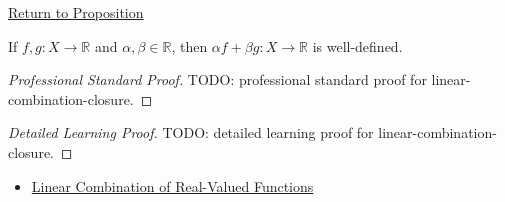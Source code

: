 \newpage
{}
\label{prf:linear-combination-closure}

\begin{remark*}[Return]
\hyperref[prop:linear-combination-closure]{Return to Proposition}
\end{remark*}

\begin{proposition*}
If \(f,g:X\to\mathbb{R}\) and \(\alpha,\beta\in\mathbb{R}\), then
\(\alpha f+\beta g:X\to\mathbb{R}\) is well-defined.
\end{proposition*}

\begin{proof}[Professional Standard Proof]
\LRAProofBodyStart
TODO: professional standard proof for linear-combination-closure.
\end{proof}

\begin{proof}[Detailed Learning Proof]
\LRAProofBodyStart
TODO: detailed learning proof for linear-combination-closure.
\end{proof}

\begin{remark*}
\end{remark*}

\begin{dependencies}
\begin{itemize}
  \item \hyperref[def:linear-combination-of-real-valued-functions]{Linear Combination of Real-Valued Functions}
\end{itemize}
\end{dependencies}

\clearpage
